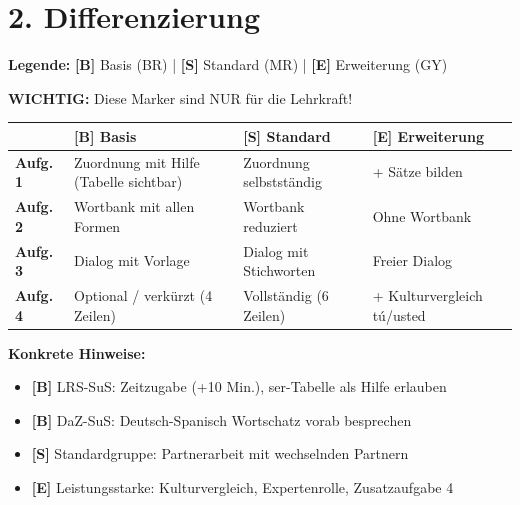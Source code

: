 \documentclass[11pt, a4paper]{article}
\newcommand{\B}{\textcolor{basis}{\textbf{[B]}}}
\newcommand{\Std}{\textcolor{standard}{\textbf{[S]}}}
\newcommand{\E}{\textcolor{erweiterung}{\textbf{[E]}}}
\begin{document}

\section*{2. Differenzierung}

\begin{differenzierung}
\textbf{Legende:} \B{} Basis (BR) | \Std{} Standard (MR) | \E{} Erweiterung (GY)

\vspace{0.5em}
\textbf{WICHTIG:} Diese Marker sind NUR für die Lehrkraft!
\end{differenzierung}

\vspace{1em}

\begin{tabularx}{\textwidth}{|l|X|X|X|}
\hline
& \B{} \textbf{Basis} & \Std{} \textbf{Standard} & \E{} \textbf{Erweiterung} \\
\hline
\textbf{Aufg. 1} & Zuordnung mit Hilfe (Tabelle sichtbar) & Zuordnung selbstständig & + Sätze bilden \\
\hline
\textbf{Aufg. 2} & Wortbank mit allen Formen & Wortbank reduziert & Ohne Wortbank \\
\hline
\textbf{Aufg. 3} & Dialog mit Vorlage & Dialog mit Stichworten & Freier Dialog \\
\hline
\textbf{Aufg. 4} & Optional / verkürzt (4 Zeilen) & Vollständig (6 Zeilen) & + Kulturvergleich tú/usted \\
\hline
\end{tabularx}

\vspace{1em}

\textbf{Konkrete Hinweise:}
\begin{itemize}
    \item \B{} LRS-SuS: Zeitzugabe (+10 Min.), ser-Tabelle als Hilfe erlauben
    \item \B{} DaZ-SuS: Deutsch-Spanisch Wortschatz vorab besprechen
    \item \Std{} Standardgruppe: Partnerarbeit mit wechselnden Partnern
    \item \E{} Leistungsstarke: Kulturvergleich, Expertenrolle, Zusatzaufgabe 4
\end{itemize}

\end{document}
